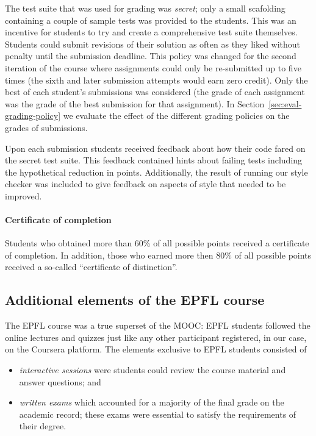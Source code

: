 \documentclass{sig-alternate}
\begin{document}
The test suite that was used for grading was {\em secret}; only a small
scafolding containing a couple of sample tests was provided to the students.
This was an incentive for students to try and create a comprehensive test
suite themselves. Students could submit revisions of their solution as often
as they liked without penalty until the submission deadline. This policy was
changed for the second iteration of the course where assignments could only be
re-submitted up to five times (the sixth and later submission attempts would
earn zero credit). Only the best of each student's submissions was considered
(the grade of each assignment was the grade of the best submission for that
assignment). In Section~\ref{sec:eval-grading-policy} we evaluate the effect
of the different grading policies on the grades of submissions.

Upon each submission students received feedback about how their code fared on
the secret test suite. This feedback contained hints about failing tests
including the hypothetical reduction in points. Additionally, the result of
running our style checker was included to give feedback on aspects of style
that needed to be improved.

\paragraph{Certificate of completion} Students who obtained more than 60\% of
all possible points received a certificate of completion. In addition, those
who earned more then 80\% of all possible points received a so-called
``certificate of distinction''.

\subsection{Additional elements of the EPFL course}

The EPFL course was a true superset of the MOOC: EPFL students followed the
online lectures and quizzes just like any other participant registered, in our
case, on the Coursera platform. The elements exclusive to EPFL students
consisted of

\begin{itemize}
\item {\em interactive sessions} were students could review the course material and
  answer questions; and
\item {\em written exams} which accounted for a majority of the final grade on the
  academic record; these exams were essential to satisfy the requirements of
  their degree.
\end{itemize}
\end{document}
